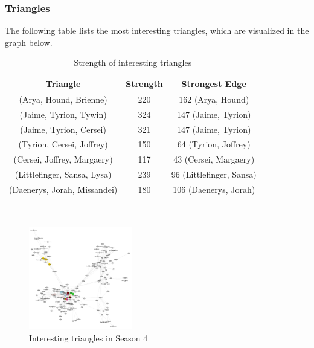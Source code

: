 \documentclass[10pt,twocolumn,letterpaper]{article}
\begin{document}
\subsubsection{Triangles}

The following table lists the most interesting triangles, which are visualized in the graph below.

\begin{table}[h!]
    \centering
    \small
    \begin{tabular}{c|c|c}
        Triangle & Strength & Strongest Edge  \\
        \hline
        (Arya, Hound, Brienne) & 220 & 162 (Arya, Hound) \\
        (Jaime, Tyrion, Tywin) & 324 & 147 (Jaime, Tyrion) \\
        (Jaime, Tyrion, Cersei) & 321 & 147 (Jaime, Tyrion) \\
        (Tyrion, Cersei, Joffrey) & 150 & 64 (Tyrion, Joffrey) \\
        (Cersei, Joffrey, Margaery) & 117 & 43 (Cersei, Margaery) \\
        (Littlefinger, Sansa, Lysa) & 239 & 96 (Littlefinger, Sansa) \\
        (Daenerys, Jorah, Missandei) & 180 & 106 (Daenerys, Jorah) \\
        \hline 
    \end{tabular} \\
    \vspace{0.2cm}
    \caption{Strength of interesting triangles}
    \label{tab:my_label}
\end{table}

\begin{figure}[!h]
    \centering
    \includegraphics[width=0.4\textwidth]{img/s4/s4_triangles.jpg}
    \caption{\small{Interesting triangles in Season 4}}
\end{figure}
\end{document}
